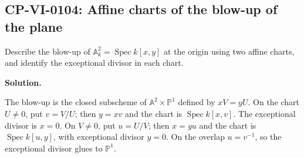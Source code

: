 
\subsection*{CP-VI-0104: Affine charts of the blow-up of the plane}

Describe the blow-up of $\mathbb A_k^2=\operatorname{Spec}k[x,y]$ at the origin using two affine charts, and identify the exceptional divisor in each chart.

\medskip
\noindent\textbf{Solution.}

The blow-up is the closed subscheme of $\mathbb A^2\times\mathbb P^1$ defined by $xV=yU$. On the chart $U\ne0$, put $v=V/U$; then $y=xv$ and the chart is $\operatorname{Spec}k[x,v]$. The exceptional divisor is $x=0$. On $V\ne0$, put $u=U/V$; then $x=yu$ and the chart is $\operatorname{Spec}k[u,y]$, with exceptional divisor $y=0$. On the overlap $u=v^{-1}$, so the exceptional divisor glues to $\mathbb P^1$.

